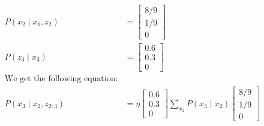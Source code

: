 \documentclass[answers]{exam}
\begin{document}
\begin{questions}
\begin{parts}
\begin{solution}
            \begin{align*}
                P(x_2 \mid x_1, z_2)     & = \begin{bmatrix}
                                                 8/9 \\
                                                 1/9 \\
                                                 0
                                             \end{bmatrix}                                               \\
                P(z_3 \mid x_3)          & = \begin{bmatrix}
                                                 0.6 \\
                                                 0.3 \\
                                                 0
                                             \end{bmatrix}                                               \\
                \text{We get the following equation:}                                                     \\
                P(x_3 \mid x_2, z_{2:3}) & = \eta \begin{bmatrix}
                                                      0.6 \\
                                                      0.3 \\
                                                      0
                                                  \end{bmatrix} \sum_{x_2} P(x_3 \mid x_2) \begin{bmatrix}
                                                                                               8/9 \\
                                                                                               1/9 \\
                                                                                               0
                                                                                           \end{bmatrix}
            \end{align*}


\end{solution}
\end{parts}
\end{questions}
\end{document}
